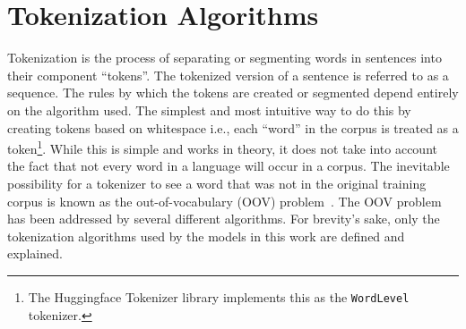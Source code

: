 \documentclass[12pt]{article}
\begin{document}



\section{Tokenization Algorithms}\label{sec:tokenizers}
Tokenization is the process of separating or segmenting words in sentences into their component ``tokens''. The tokenized version of a sentence is
referred to as a sequence. The rules by which the tokens are created or segmented depend entirely on the algorithm used. The simplest and most
intuitive way to do this by creating tokens based on whitespace i.e., each ``word'' in the corpus is  treated as a token\footnote{The Huggingface
    Tokenizer library implements this as the \lstinline|WordLevel| tokenizer.}. While this is simple and works in theory, it does not take into
account the fact that not every word in a language will occur in a corpus. The inevitable possibility for a tokenizer to see a word that was not in
the original training corpus is known as the out-of-vocabulary (OOV) problem~\cite{wu_googles_2016}. The OOV problem has been addressed by several
different algorithms. For brevity's sake, only the tokenization algorithms used by the models in this work are defined and explained.
\end{document}
